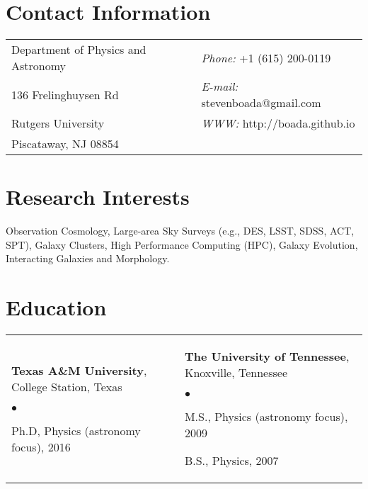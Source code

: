 \documentclass[margin,line, 11pt]{res}
\newenvironment{list2}{
  \begin{list}{$\bullet$}{%
      \setlength{\itemsep}{0in}
      \setlength{\parsep}{0in} \setlength{\parskip}{0in}
      \setlength{\topsep}{0in} \setlength{\partopsep}{0in}
      \setlength{\leftmargin}{0.2in}}}{\end{list}}
\begin{document}

\begin{resume}
\section{Contact Information}
\vspace{.05in}
\begin{tabular}{@{}p{3in}p{3in}}
Department of Physics and Astronomy & {\it Phone:}  +1 (615) 200-0119 \\
136 Frelinghuysen Rd   & {\it E-mail:}  stevenboada@gmail.com \\
Rutgers University & {\it WWW:} http://boada.github.io \\
Piscataway, NJ 08854  & \\
\end{tabular}

\section{Research Interests}
Observation Cosmology, Large-area Sky Surveys (e.g., DES, LSST, SDSS, ACT, SPT), Galaxy Clusters, High Performance Computing (HPC), Galaxy Evolution, Interacting Galaxies and Morphology.
\vspace*{-3mm}

\section{Education}
\begin{tabular}{@{}p{3in}p{3in}}
  \textbf{Texas A\&M University}, College Station, Texas
  \begin{list2}
  	\item Ph.D, Physics (astronomy focus), 2016
  \end{list2} &
  \textbf{The University of Tennessee}, Knoxville, Tennessee
  \begin{list2}
  	\item M.S., Physics (astronomy focus), 2009
  	\item B.S., Physics, 2007
  \end{list2} \\
\end{tabular}
\vspace*{-2.5mm}


\end{resume}
\end{document}
